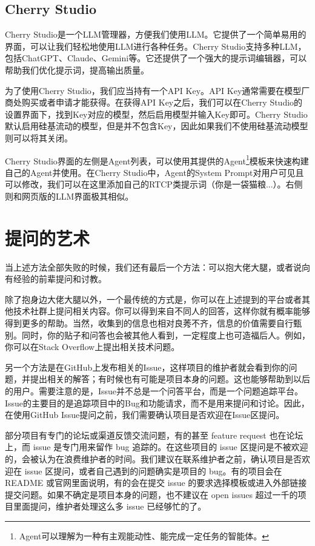 \documentclass[../main.tex]{subfiles}
\begin{document}
\subsection{Cherry Studio}

Cherry Studio是一个LLM管理器，方便我们使用LLM。它提供了一个简单易用的界面，可以让我们轻松地使用LLM进行各种任务。Cherry Studio支持多种LLM，包括ChatGPT、Claude、Gemini等。它还提供了一个强大的提示词编辑器，可以帮助我们优化提示词，提高输出质量。

为了使用Cherry Studio，我们应当持有一个API Key。API Key通常需要在模型厂商处购买或者申请才能获得。在获得API Key之后，我们可以在Cherry Studio的设置界面下，找到Key对应的模型，然后启用模型并输入Key即可。Cherry Studio默认启用硅基流动的模型，但是并不包含Key，因此如果我们不使用硅基流动模型则可以将其关闭。

Cherry Studio界面的左侧是Agent列表，可以使用其提供的Agent\footnote{Agent可以理解为一种有主观能动性、能完成一定任务的智能体。}模板来快速构建自己的Agent并使用。在Cherry Studio中，Agent的System Prompt对用户可见且可以修改，我们可以在这里添加自己的RTCP类提示词（你是一袋猫粮...）。右侧则和网页版的LLM界面极其相似。

\section{提问的艺术}

当上述方法全部失败的时候，我们还有最后一个方法：可以抱大佬大腿，或者说向有经验的前辈提问和讨教。

除了抱身边大佬大腿以外，一个最传统的方式是，你可以在上述提到的平台或者其他技术社群上提问相关内容。你可以得到来自不同人的回答，这样你就有概率能够得到更多的帮助。当然，收集到的信息也相对良莠不齐，信息的价值需要自行甄别。同时，你的贴子和问答也会被其他人看到，一定程度上也可造福后人。例如，你可以在Stack Overflow上提出相关技术问题。

另一个方法是在GitHub上发布相关的Issue，这样项目的维护者就会看到你的问题，并提出相关的解答；有时候也有可能是项目本身的问题。这也能够帮助到以后的用户。需要注意的是，Issue并不总是一个问答平台，而是一个问题追踪平台。Issue的主要目的是追踪项目中的Bug和功能请求，而不是用来提问和讨论。因此，在使用GitHub Issue提问之前，我们需要确认项目是否欢迎在Issue区提问。

部分项目有专门的论坛或渠道反馈交流问题，有的甚至 feature request 也在论坛上，而 issue 是专门用来留作 bug 追踪的。在这些项目的 issue 区提问是不被欢迎的，会被认为在浪费维护者的时间。我们建议在联系维护者之前，确认项目是否欢迎在 issue 区提问，或者自己遇到的问题确实是项目的 bug。有的项目会在 README 或官网里面说明，有的会在提交 issue 的要求选择模板或进入外部链接提交问题。如果不确定是项目本身的问题，也不建议在 open issues 超过一千的项目里面提问，维护者处理这么多 issue 已经够忙的了。
\end{document}
